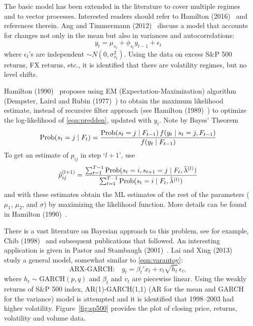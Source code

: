 The basic model has been extended in the literature to cover multiple regimes and to vector processes. Interested readers should refer to Hamilton (2016)~\cite{jdham} and references therein. Ang and Timmermann (2012)~\cite{timmerman} discuss a model that accounts for changes not only in the mean but also in variances and autocorrelations:
	\begin{equation} \label{eqn:varautoy}
	y_t= \mu_{s_t} + \phi_{s_t} y_{t-1} + \epsilon_t
	\end{equation}
where $\epsilon_t$'s are independent $\sim N(0,\sigma_{s_t}^2)$. Using the data on excess S\&P 500 returns, FX returns, etc., it is identified that there are volatility regimes, but no level shifts.


Hamilton (1990)~\cite{90ham} proposes using EM (Expectation-Maximization) algorithm (Dempster, Laird and Rubin (1977)~\cite{dempster}) to obtain the maximum likelihood estimate, instead of recursive filter approach (see Hamilton (1989)~\cite{89ham}) to optimize the log-likelihood of \eqref{eqn:predden}, updated with $y_t$. Note by Bayes' Theorem
	\begin{equation} \label{eqn:bayes}
	\prob(s_t= j \;|\; F_t) = \dfrac{\prob(s_t= j \;|\; F_{t-1}) \, f(y_t\;|\; s_t=j, F_{t-1})}{f(y_t \;|\; F_{t-1})}
	\end{equation}
To get an estimate of $p_{ij}$ in step `$l+1$', use 
	\begin{equation}\label{eqn:hatpijl}
	\hat{p}_{ij}^{(l+1)}= \dfrac{\sum_{t=1}^{T-1} \prob(s_t= i, s_{t+1}= j \;|\; F_t, \hat{\lambda}^{(l)})}{\sum_{t=1}^{T-1} \prob(s_t= i \;|\; F_t, \hat{\lambda}^{(l)})}
	\end{equation}
and with these estimates obtain the ML estimates of the rest of the parameters ($\mu_1$, $\mu_2$, and $\sigma$) by maximizing the likelihood function. More details can be found in Hamilton (1990)~\cite{90ham}.


There is a vast literature on Bayesian approach to this problem, see for example, Chib (1998)~\cite{chib} and subsequent publications that followed. An interesting application is given in Pastor and Stambaugh (2001)~\cite{pastor}. Lai and Xing (2013)~\cite{laixing} study a general model, somewhat similar to \eqref{eqn:varautoy}:
	\begin{equation} \label{eqn:arxgarch}
	\text{ARX-GARCH:} \quad y_t= \beta_t' x_t + v_t \sqrt{h_t} \, \epsilon_t,
	\end{equation}
where $h_t \sim \text{GARCH}(p,q)$ and $\beta_t$ and $v_t$ are piecewise linear. Using the weakly returns of S\&P 500 index, AR(1)-GARCH(1,1) (AR for the mean and GARCH for the variance) model is attempted and it is identified that 1998--2003 had higher volatility. Figure~\ref{fig:sp500} provides the plot of closing price, returns, volatility and volume data. 

